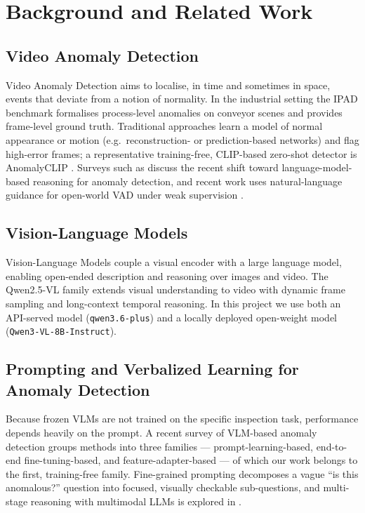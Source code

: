 \chapter{Background and Related Work}
\label{chap:background}

\section{Video Anomaly Detection}
Video Anomaly Detection aims to localise, in time and sometimes in space, events that
deviate from a notion of normality. In the industrial setting the IPAD benchmark
\cite{ipad} formalises process-level anomalies on conveyor scenes and provides
frame-level ground truth. Traditional approaches learn a model of normal appearance or
motion (e.g.\ reconstruction- or prediction-based networks) and flag high-error frames;
a representative training-free, CLIP-based zero-shot detector is AnomalyCLIP
\cite{anomalyclip}. Surveys such as \cite{quovadis} discuss the recent shift toward
language-model-based reasoning for anomaly detection, and recent work uses natural-language
guidance for open-world VAD under weak supervision \cite{langguided}.

\section{Vision-Language Models}
Vision-Language Models couple a visual encoder with a large language model, enabling
open-ended description and reasoning over images and video. The Qwen2.5-VL family
\cite{qwen25vl} extends visual understanding to video with dynamic frame sampling and
long-context temporal reasoning. In this project we use both an API-served model
(\texttt{qwen3.6-plus}) and a locally deployed open-weight model
(\texttt{Qwen3-VL-8B-Instruct}).

\section{Prompting and Verbalized Learning for Anomaly Detection}
Because frozen VLMs are not trained on the specific inspection task, performance depends
heavily on the prompt. A recent survey of VLM-based anomaly detection \cite{vtadsurvey}
groups methods into three families --- prompt-learning-based, end-to-end
fine-tuning-based, and feature-adapter-based --- of which our work belongs to the first,
training-free family. Fine-grained prompting \cite{finegrained} decomposes a vague
``is this anomalous?'' question into focused, visually checkable sub-questions, and
multi-stage reasoning with multimodal LLMs is explored in \cite{towardszeroshot}.

